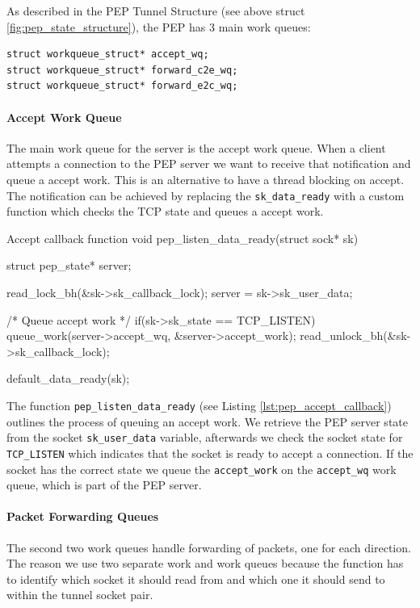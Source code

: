 \documentclass[a4paper,english, 11pt]{report}
\begin{document}
As described in the PEP Tunnel Structure (see above struct \ref{fig:pep_state_structure}), the PEP has 3 main work queues:
\begin{verbatim}
struct workqueue_struct* accept_wq;
struct workqueue_struct* forward_c2e_wq;
struct workqueue_struct* forward_e2c_wq;
\end{verbatim}

\paragraph{Accept Work Queue}
The main work queue for the server is the accept work queue. When a client attempts a connection to the PEP server we want to receive that notification and queue a accept work. This is an alternative to have a thread blocking on accept. The notification can be achieved by replacing the \verb|sk_data_ready| with a custom function which checks the TCP state and queues a accept work.\\

\begin{autonumlstlisting}[label=lst:pep_accept_callback]{Accept callback function}
void pep_listen_data_ready(struct sock* sk)
{
	struct pep_state* server;

	read_lock_bh(&sk->sk_callback_lock);
	server = sk->sk_user_data;

	/* Queue accept work */
	if(sk->sk_state == TCP_LISTEN){
		queue_work(server->accept_wq, &server->accept_work);
	}
	read_unlock_bh(&sk->sk_callback_lock);

	default_data_ready(sk);
}
\end{autonumlstlisting}

The function \verb|pep_listen_data_ready| (see Listing \ref{lst:pep_accept_callback}) outlines the process of queuing an accept work. We retrieve the PEP server state from the socket \verb|sk_user_data| variable, afterwards we check the socket state for \verb|TCP_LISTEN| which indicates that the socket is ready to accept a connection. If the socket has the correct state we queue the \verb|accept_work| on the \verb|accept_wq| work queue, which is part of the PEP server.

\paragraph{Packet Forwarding Queues}\label{sec:forward_queues}
The second two work queues handle forwarding of packets, one for each direction. The reason we use two separate work and work queues because the function has to identify which socket it should read from and which one it should send to within the tunnel socket pair. \\
\end{document}
